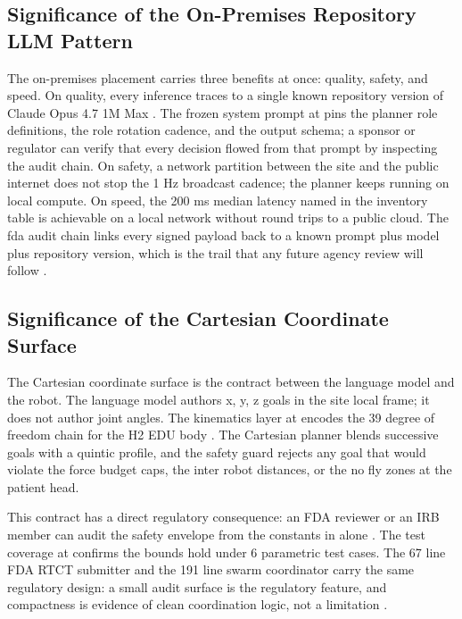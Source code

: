 \begin{sectionaccent}
\subsection{Significance of the On-Premises Repository LLM Pattern}
\label{sec:discussion-onprem}

The on-premises placement carries three benefits at once: quality,
safety, and speed. On quality, every inference traces to a single
known repository version of Claude Opus 4.7 1M Max
\cite{anthropic_claude_opus_47_2026}. The frozen system prompt at
 pins the planner role
definitions, the role rotation cadence, and the output schema; a
sponsor or regulator can verify that every decision flowed from
that prompt by inspecting the audit chain. On safety, a network
partition between the site and the public internet does not stop
the 1 Hz broadcast cadence; the planner keeps running on local
compute. On speed, the 200 ms median latency named in the inventory
table is achievable on a local network without round trips to a
public cloud. The fda audit chain links every signed payload back
to a known prompt plus model plus repository version, which is the
trail that any future agency review will follow
\cite{iec_62304, ich_e6r3_2025}.

\subsection{Significance of the Cartesian Coordinate Surface}
\label{sec:discussion-cartesian}

The Cartesian coordinate surface is the contract between the
language model and the robot. The language model authors x, y, z
goals in the site local frame; it does not author joint angles. The
kinematics layer at  encodes
the 39 degree of freedom chain for the H2 EDU body
\cite{unitree_h2_2026}. The Cartesian planner blends successive
goals with a quintic profile, and the safety guard rejects any goal
that would violate the force budget caps, the inter robot distances,
or the no fly zones at the patient head. 

This contract has a direct
regulatory consequence: an FDA reviewer or an IRB member can audit
the safety envelope from the constants in  alone
\cite{iec_80601_2_77}. The test coverage at
 confirms the bounds
hold under 6 parametric test cases. The 67 line FDA RTCT submitter
and the 191 line swarm coordinator carry the same regulatory design:
a small audit surface is the regulatory feature, and compactness is
evidence of clean coordination logic, not a limitation
\cite{iec_62304}.


\end{sectionaccent}
